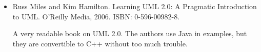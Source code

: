 \begin{itemize}
\item
Russ Miles and Kim Hamilton. Learning UML 2.0: A Pragmatic Introduction to UML. O’Reilly Media, 2006. ISBN: 0-596-00982-8.

A very readable book on UML 2.0. The authors use Java in examples, but they are convertible to C++ without too much trouble.
\end{itemize}